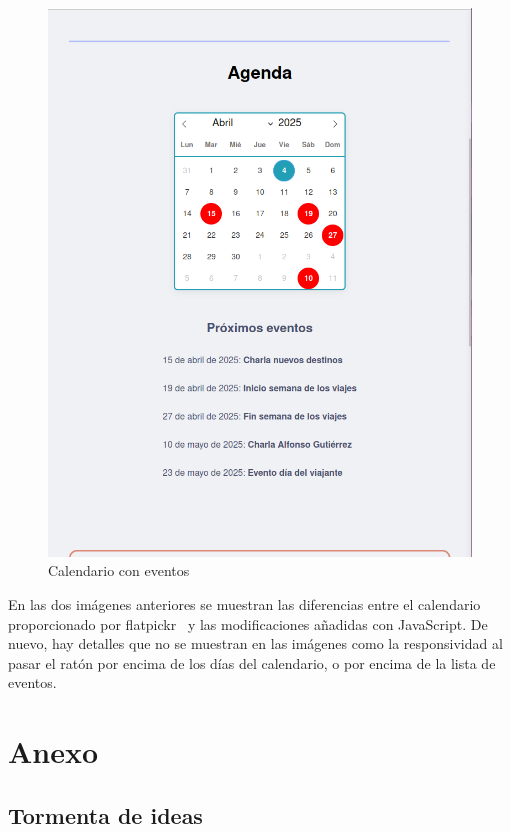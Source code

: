 \documentclass[11pt, a4paper]{book}
\begin{document}
	\begin{figure} [H]
		\centering
		\includegraphics[height=0.4\textheight]{CSS/3 extra2.png}
		\caption{Calendario con eventos}
	\end{figure}
	

	En las dos imágenes anteriores se muestran las diferencias entre el calendario proporcionado por flatpickr~\cite{flatpickr} y las modificaciones añadidas con JavaScript. De nuevo, hay detalles que no se muestran en las imágenes como la responsividad al pasar el ratón por encima de los días del calendario, o por encima de la lista de eventos.
	
	
	
	\chapter{Anexo}
	\label{chap:anexo1}
	\section{Tormenta de ideas}
	
\end{document}
